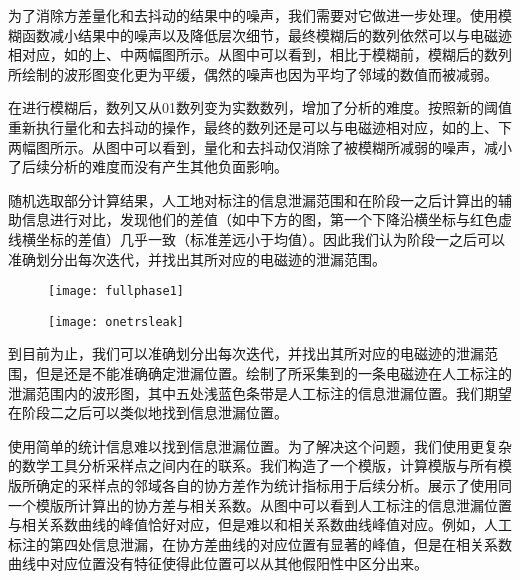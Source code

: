 {	为了消除方差量化和去抖动的结果中的噪声，我们需要对它做进一步处理。使用模糊函数减小结果中的噪声以及降低层次细节，最终模糊后的数列依然可以与电磁迹相对应，如的上、中两幅图所示。从图中可以看到，相比于模糊前，模糊后的数列所绘制的波形图变化更为平缓，偶然的噪声也因为平均了邻域的数值而被减弱。
	
	在进行模糊后，数列又从01数列变为实数数列，增加了分析的难度。按照新的阈值重新执行量化和去抖动的操作，最终的数列还是可以与电磁迹相对应，如的上、下两幅图所示。从图中可以看到，量化和去抖动仅消除了被模糊所减弱的噪声，减小了后续分析的难度而没有产生其他负面影响。

	随机选取部分计算结果，人工地对标注的信息泄漏范围和在阶段一之后计算出的辅助信息进行对比，发现他们的差值（如中下方的图，第一个下降沿横坐标与红色虚线横坐标的差值）几乎一致（标准差远小于均值）。因此我们认为阶段一之后可以准确划分出每次迭代，并找出其所对应的电磁迹的泄漏范围。
	
	\begin{figure}[!h]
		\begin{center}
			\texttt{[image: fullphase1]}
			\label{fig:fullphase1}
		\end{center}
	\end{figure}
	
	\begin{figure}[!h]
		\begin{center}
			\texttt{[image: onetrsleak]}
			\label{fig:onetrsleak}
		\end{center}
	\end{figure}

	到目前为止，我们可以准确划分出每次迭代，并找出其所对应的电磁迹的泄漏范围，但是还是不能准确确定泄漏位置。绘制了所采集到的一条电磁迹在人工标注的泄漏范围内的波形图，其中五处浅蓝色条带是人工标注的信息泄漏位置。我们期望在阶段二之后可以类似地找到信息泄漏位置。
	
	使用简单的统计信息难以找到信息泄漏位置。为了解决这个问题，我们使用更复杂的数学工具分析采样点之间内在的联系。我们构造了一个模版，计算模版与所有模版所确定的采样点的邻域各自的协方差作为统计指标用于后续分析。展示了使用同一个模版所计算出的协方差与相关系数。从图中可以看到人工标注的信息泄漏位置与相关系数曲线的峰值恰好对应，但是难以和相关系数曲线峰值对应。例如，人工标注的第四处信息泄漏，在协方差曲线的对应位置有显著的峰值，但是在相关系数曲线中对应位置没有特征使得此位置可以从其他假阳性中区分出来。
	
}
